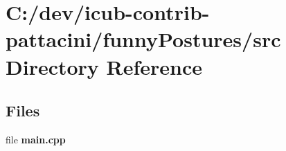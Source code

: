 \section{C\+:/dev/icub-\/contrib-\/pattacini/funny\+Postures/src Directory Reference}
\label{dir_d171c69592dbdc36f8589373554bdacf}
\subsection*{Files}
\begin{DoxyCompactItemize}
\item 
file {\bfseries main.\+cpp}
\end{DoxyCompactItemize}
